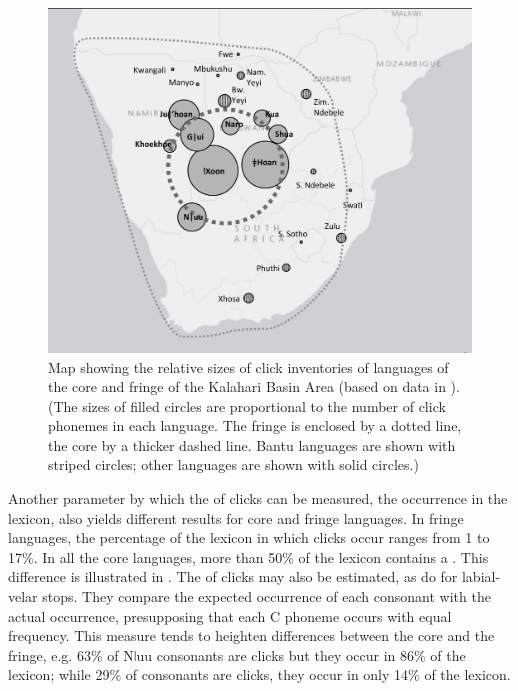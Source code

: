 \documentclass[output=paper
,newtxmath
,modfonts
,nonflat]{langsci/langscibook}
\begin{document}
\begin{figure}
\includegraphics[width=\textwidth]{figures/sands-fig1.png}
\caption{Map showing the relative sizes of click inventories of languages of the core and fringe of the Kalahari Basin Area (based on data in ). (The sizes of filled circles are proportional to the number of click phonemes in each language. The fringe is enclosed by a dotted line, the core by a thicker dashed line. Bantu languages are shown with striped circles; other languages are shown with solid circles.)} 
\label{fig:sands:1}
\end{figure}

Another parameter by which the  of clicks can be measured, the occurrence in the lexicon, also yields different results for core and fringe languages. In  fringe languages, the percentage of the lexicon in which clicks occur ranges from 1 to 17\%. In all the core languages, more than 50\% of the lexicon contains a . This difference is illustrated in . The  of clicks may also be estimated, as \citet{idiatov2016} do for labial-velar stops. They compare the expected occurrence of each consonant with the actual occurrence, presupposing that each C phoneme occurs with equal frequency. This measure tends to heighten differences between the core and the fringe, e.g. 63\% of Nǀuu consonants are clicks but they occur in 86\% of the lexicon; while 29\% of  consonants are clicks, they occur in only 14\% of the lexicon. 
\end{document}
